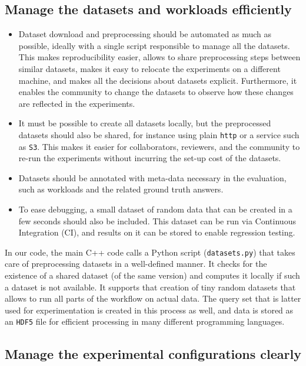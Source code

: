 \documentclass{llncs}
\begin{document}
\subsection{Manage the datasets and workloads efficiently}

\begin{itemize}
\item Dataset download and preprocessing should be automated as much as possible,
  ideally with a single script responsible to manage all the datasets.
  This makes reproducibility easier, allows to share preprocessing steps between similar datasets,
  makes it easy to relocate the experiments on a different machine, and makes all the
  decisions about datasets explicit.
  Furthermore, it enables the community to change the datasets to observe how these changes
  are reflected in the experiments.
\item It must be possible to create all datasets locally, 
  but the preprocessed datasets should also be shared, for instance using plain 
  \texttt{http} or a service such as \texttt{S3}.
  This makes it easier for collaborators, reviewers, and the community to re-run the
  experiments without incurring the set-up cost of the datasets.
\item Datasets should be annotated with meta-data necessary in the evaluation, 
  such as workloads and the related ground truth answers.
\item To ease debugging, a small dataset of random data that can be created in a few
  seconds should also be included. This dataset can be run via Continuous Integration (CI), and results on it can be stored to enable regression testing. 
\end{itemize}
%
In our code, the main C++ code calls a Python script ({\tt datasets.py}) that takes care of preprocessing datasets in a well-defined manner. It checks for the existence of a shared dataset (of the same version) and computes it locally if such a dataset is not available. It supports that creation of tiny random datasets that allows to run all parts of the workflow on actual data. The query set that is latter used for experimentation is created in this process as well, and data is stored as an {\tt HDF5} file for efficient processing in many different programming languages.

\subsection{Manage the experimental configurations clearly}
\end{document}
